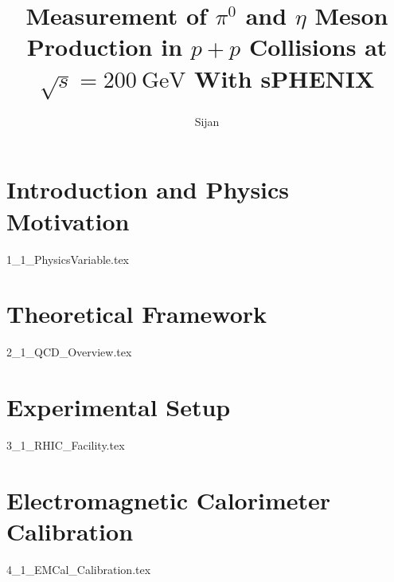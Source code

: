 \documentclass[numbered,pdftex]{ohio-etd}
\title{Measurement of \texorpdfstring{$\pi^{0}$}{pi0} and \texorpdfstring{$\eta$}{eta} Meson Production in \texorpdfstring{$p+p$}{p+p} Collisions at \texorpdfstring{$\sqrt{s} = 200~\mathrm{GeV}$}{sqrt(sNN) = 200 GeV} With sPHENIX}
\author    {Sijan}{Regmi}
\begin{document}
\makefrontmatter    %



\chapter{Introduction and Physics Motivation}
{1_1_PhysicsVariable.tex}


\chapter{Theoretical Framework}
{2_1_QCD_Overview.tex}


\chapter{Experimental Setup}
{3_1_RHIC_Facility.tex}


\chapter{Electromagnetic Calorimeter Calibration}
{4_1_EMCal_Calibration.tex}


\end{document}

